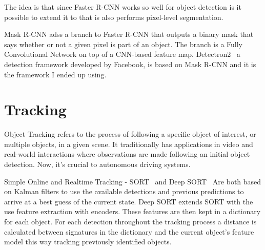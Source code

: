 The idea is that since Faster R-CNN works so well for object detection is it
possible to extend it to that is also performs pixel-level segmentation. 

Mask R-CNN adss a branch to Faster R-CNN that outputs a binary mask that says
whether or not a given pixel is part of an object. The branch is a Fully
Convolutional Network on top of a CNN-based feature map.
Detectron2~\cite{wu2019detectron2} a detection framework developed by Facebook,
is based on Mask R-CNN and it is the framework I ended up using.

\section{Tracking}
Object Tracking refers to the process of following a specific object of
interest, or multiple objects, in a given scene. It traditionally has
applications in video and real-world interactions where observations are made
following an initial object detection. Now, it’s crucial to autonomous driving
systems.

Simple Online and Realtime Tracking - SORT~\cite{Wojke2017simple} and Deep
SORT~\cite{Wojke2018deep} Are both based on Kalman filters to use the available
detections and previous predictions to arrive at a best guess of the current
state. Deep SORT extends SORT with the use feature extraction with encoders.
These features are then kept in a dictionary for each object. For each detection
throughout the tracking process a distance is calculated between signatures in
the dictionary and the current object's feature model this way tracking
previously identified objects. 








